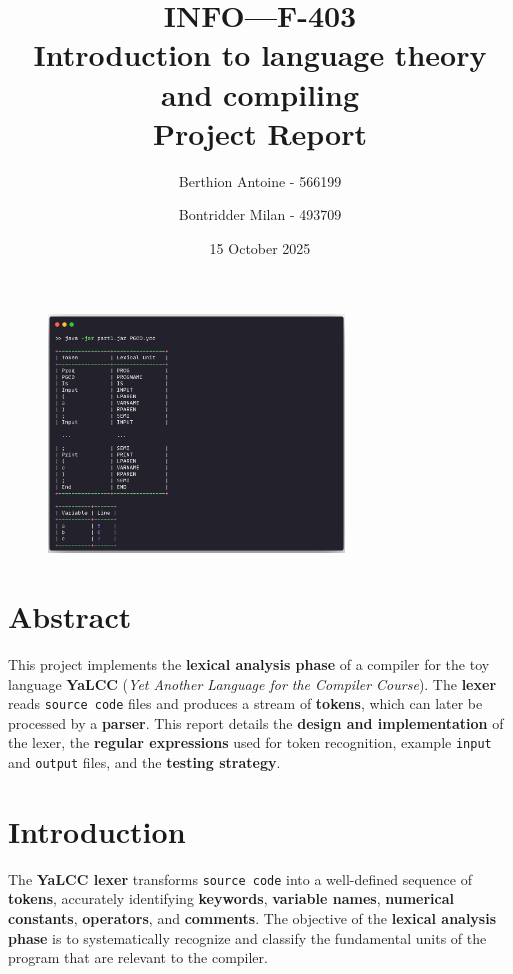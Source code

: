 \documentclass{article}
\title{\textbf{INFO—F-403} \\
Introduction to language theory and compiling \\ 
Project Report}
\author{Berthion Antoine - 566199 \and Bontridder Milan - 493709}
\date{15 October 2025}
\begin{document}
\maketitle

\vspace{-2em}

\begin{figure}[H]
    \centering
    \includegraphics[width=0.7\textwidth]{src/intro.png}
    \label{fig:intro}
\end{figure}

\vspace{-1em}

\section*{Abstract}

This project implements the \textbf{lexical analysis phase} of a compiler for the toy language \textbf{YaLCC} (\textit{Yet Another Language for the Compiler Course}). The \textbf{lexer} reads \texttt{source code} files and produces a stream of \textbf{tokens}, which can later be processed by a \textbf{parser}. This report details the \textbf{design and implementation} of the lexer, the \textbf{regular expressions} used for token recognition, example \texttt{input} and \texttt{output} files, and the \textbf{testing strategy}.


\section{Introduction}

\noindent The \textbf{YaLCC lexer} transforms \texttt{source code} into a well-defined sequence of \textbf{tokens}, accurately identifying \textbf{keywords}, \textbf{variable names}, \textbf{numerical constants}, \textbf{operators}, and \textbf{comments}. The objective of the \textbf{lexical analysis phase} is to systematically recognize and classify the fundamental units of the program that are relevant to the compiler. \\
\end{document}

